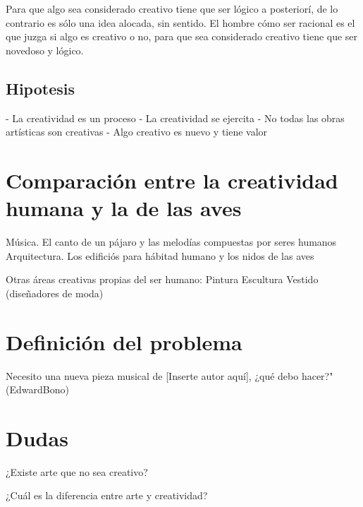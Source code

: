 Para que algo sea considerado creativo tiene que ser lógico a posteriorí, de lo contrario es sólo una idea alocada, sin sentido. El hombre cómo ser racional es el que juzga si algo es creativo o no, para que sea considerado creativo tiene que ser novedoso y lógico.

\subsection{Hipotesis}


- La creatividad es un proceso
- La creatividad se ejercita
- No todas las obras artísticas son creativas
- Algo creativo es nuevo y tiene valor


\section{Comparación entre la creatividad humana y la de las aves}

    Música. El canto de un pájaro y las melodías compuestas por seres humanos
    Arquitectura. Los edificiós para hábitad humano y los nidos de las aves
    
Otras áreas creativas propias del ser humano:
    Pintura
    Escultura
    Vestido (diseñadores de moda)
    

\section{Definición del problema}
Necesito una nueva pieza musical de [Inserte autor aquí], ¿qué debo hacer?" (EdwardBono)


\section{Dudas}

¿Existe arte que no sea creativo?

¿Cuál es la diferencia entre arte y creatividad?